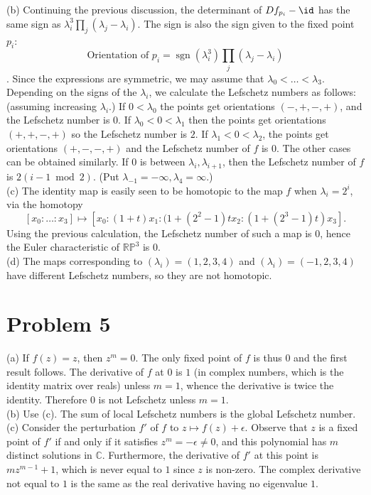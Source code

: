 \documentclass{amsart}
\numberwithin{equation}{section}
\theoremstyle{plain}
\theoremstyle{definition}
\theoremstyle{remark}
\renewcommand{\_}[2]{\underbrace{#1}_{#2}}
\renewcommand{\^}[2]{\overbrace{#1}_{#2}}
\newcommand{\R}{\mathbb{R}}
\renewcommand{\P}{\mathbb{P}}
\newcommand{\C}{\mathbb{C}}
\newcommand{\sgn}{\operatorname{sgn}}
\begin{document}
(b) Continuing the previous discussion, the determinant of $Df_{p_i} - \id$ has the same sign as $\lambda_i^3\prod_j (\lambda_j - \lambda_i)$. The sign is also the sign given to the fixed point $p_i$: \[\text{Orientation of $p_i$} = \sgn(\lambda_i^3)\prod_j (\lambda_j - \lambda_i)\]. Since the expressions are symmetric, we may assume that $\lambda_0 < \dots < \lambda_3$. Depending on the signs of the $\lambda_i$, we calculate the Lefschetz numbers as follows: (assuming increasing $\lambda_i$.) If $0<\lambda_0$ the points get orientations $(-,+,-,+)$, and the Lefschetz number is $0$. If $\lambda_0 < 0 < \lambda_1$ then the points get orientations $(+, +, - , +)$ so the Lefschetz number is $2$. If $\lambda_1 < 0 <\lambda_2$, the points get orientations $(+,-,-,+)$ and the Lefschetz number of $f$ is $0$. The other cases can be obtained similarly. If $0$ is between $\lambda_i, \lambda_{i+1}$, then the Lefschetz number of $f$ is $2 (i-1\bmod 2)$. (Put $\lambda_{-1} = -\infty, \lambda_4 = \infty$.)\\

(c) The identity map is easily seen to be homotopic to the map $f$ when $\lambda_i = 2^i$, via the homotopy \[[x_0:\dots:x_3] \mapsto [x_0:(1+t)x_1:(1+(2^2-1)tx_2:(1+(2^3-1)t)x_3].\] Using the previous calculation, the Lefschetz number of such a map is $0$, hence the Euler characteristic of $\R\P^3$ is $0$.\\

(d) The maps corresponding to $(\lambda_i) = (1,2,3,4)$ and $(\lambda_i) = (-1,2,3,4)$ have different Lefschetz numbers, so they are not homotopic.

\section*{Problem 5}

(a) If $f(z) = z$, then $z^m = 0$. The only fixed point of $f$ is thus $0$ and the first result follows. The derivative of $f$ at $0$ is $1$ (in complex numbers, which is the identity matrix over reals) unless $m = 1$, whence the derivative is twice the identity. Therefore $0$ is not Lefschetz unless $m = 1$.\\

(b) Use (c). The sum of local Lefschetz numbers is the global Lefschetz number.\\

(c) Consider the perturbation $f'$ of $f$ to $z\mapsto f(z) + \epsilon$. Observe that $z$ is a fixed point of $f'$ if and only if it satisfies $z^m = -\epsilon \neq 0$, and this polynomial has $m$ distinct solutions in $\C$. Furthermore, the derivative of $f'$ at this point is $mz^{m-1} + 1$, which is never equal to $1$ since $z$ is non-zero. The complex derivative not equal to $1$ is the same as the real derivative having no eigenvalue $1$.
\end{document}
